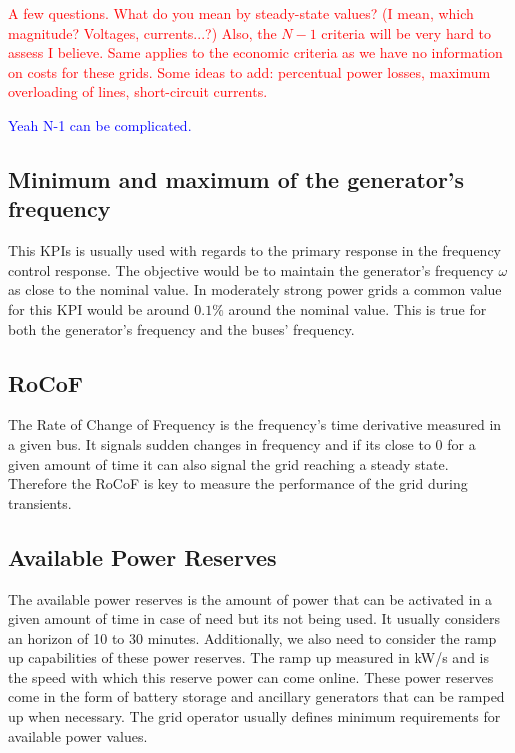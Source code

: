 \documentclass{article}
\begin{document}
\textcolor{red}{A few questions. What do you mean by steady-state values? (I mean, which magnitude? Voltages, currents...?) Also, the $N-1$ criteria will be very hard to assess I believe. Same applies to the economic criteria as we have no information on costs for these grids. Some ideas to add: percentual power losses, maximum overloading of lines, short-circuit currents.} 

\textcolor{blue}{Yeah N-1 can be complicated.} 


\subsection*{Minimum and maximum of the generator's frequency}

This KPIs is usually used with regards to the primary response in the frequency control response. The objective would be to maintain the generator's frequency $\omega$ as close to the nominal value. In moderately strong power grids a common value for this KPI would be around $0.1\%$ around the nominal value. This is true for both the generator's frequency and the buses' frequency.

\subsection*{RoCoF}

The Rate of Change of Frequency is the frequency's time derivative measured in a given bus. It signals sudden changes in frequency and if its close to $0$ for a given amount of time it can also signal the grid reaching a steady state. Therefore the RoCoF is key to measure the performance of the grid during transients. 

\subsection*{Available Power Reserves}

The available power reserves is the amount of power that can be activated in a given amount of time in case of need but its not being used. It usually considers an horizon of 10 to 30 minutes. Additionally, we also need to consider the ramp up capabilities of these power reserves. The ramp up measured in kW/s and is the speed with which this reserve power can come online. These power reserves come in the form of battery storage and ancillary generators that can be ramped up when necessary. The grid operator usually defines minimum requirements for available power values.
\end{document}
